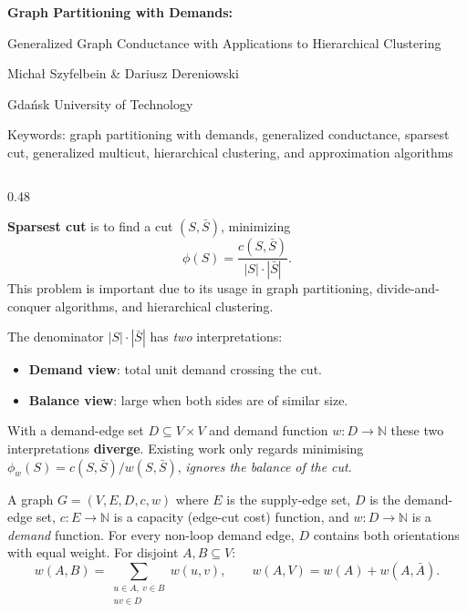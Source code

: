 \documentclass[final]{beamer}
\newcommand{\br}[1]{\left(#1\right)}
\newcommand{\defterm}[2]{%
  \begin{tcolorbox}[defbox,title={Definition: #1}]
  #2
  \end{tcolorbox}}
\begin{document}
\begin{frame}[t]{}

\begin{tcolorbox}[
  enhanced,colback=titlebg,colframe=titlebg,arc=0pt,boxrule=0pt,
  left=12mm,right=12mm,top=12mm,bottom=12mm
]
  {\color{white}\bfseries\fontsize{174}{202}\selectfont
   Graph Partitioning with Demands:\par
   \fontsize{78}{92}\selectfont
   Generalized Graph Conductance with Applications to Hierarchical Clustering}
  \par
  {\color{accentblue!80!white}\large
   Micha{\l} Szyfelbein \quad \& \quad Dariusz Dereniowski\par
    Gda\'nsk University of Technology\par
    \smallskip
    Keywords: graph partitioning with demands, generalized conductance, sparsest cut, generalized multicut, hierarchical clustering, and approximation algorithms}
\end{tcolorbox}


\begin{columns}[T]

\begin{column}{0.48\textwidth}

\begin{tcolorbox}[posterbox,title={Motivation}]
\textbf{Sparsest cut} is to find a cut $\br{S, \bar{S}}$, minimizing
\[
  \phi(S) = \frac{c(S,\bar S)}{|S|\cdot|\bar S|}.
\]
This problem is important due to its usage in graph partitioning,
divide-and-conquer algorithms, and hierarchical clustering.

\medskip
The denominator $|S|\cdot|\bar S|$ has \emph{two} interpretations:
\begin{itemize}
  \item \textbf{Demand view}: total unit demand crossing the cut.
  \item \textbf{Balance view}: large when both sides are of similar size.
\end{itemize}

\medskip
With a demand-edge set $D\subseteq V\times V$ and demand function $w\colon D\to\mathbb{N}$ these two
interpretations \textbf{diverge}.  Existing work
only regards minimising $\phi_w(S)=c(S,\bar S)/w(S,\bar S)$, \emph{ignores the balance of the cut}.
\end{tcolorbox}



\defterm{Graph with demands}{
  A graph $G=(V,E,D,c,w)$ where $E$ is the supply-edge set, $D$ is the
  demand-edge set, $c\colon E\to\mathbb{N}$ is a capacity (edge-cut cost)
  function, and $w\colon D\to\mathbb{N}$ is a \emph{demand} function. For
  every non-loop demand edge, $D$ contains both orientations with equal weight.
  For disjoint $A,B\subseteq V$:
  \[
    w(A,B)=\sum_{\substack{u\in A,\ v\in B\\uv\in D}}w(u,v),\qquad
    w(A,V)=w(A)+w(A,\bar A).
  \]
}




\end{column}
\end{columns}
\end{frame}
\end{document}
